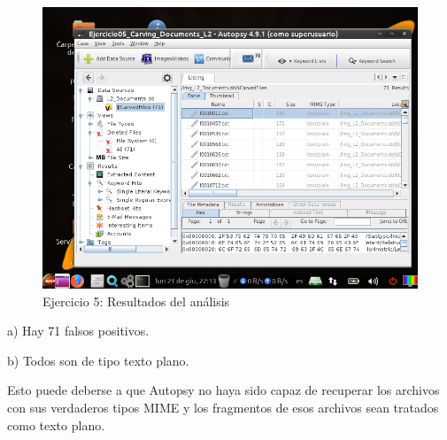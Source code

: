 \documentclass[11pt]{article}
\begin{document}
\begin{figure}[H]
  \caption{Ejercicio 5: Resultados del análisis}
  \centering
  \includegraphics[scale=0.7]{e5-5.png}
\end{figure}

a) Hay 71 falsos positivos.

b) Todos son de tipo texto plano.

Esto puede deberse a que Autopsy no haya sido capaz de recuperar los archivos con sus verdaderos tipos MIME y los fragmentos de esos archivos sean tratados como texto plano.



\begin{thebibliography}{8}
\end{thebibliography}
\end{document}

